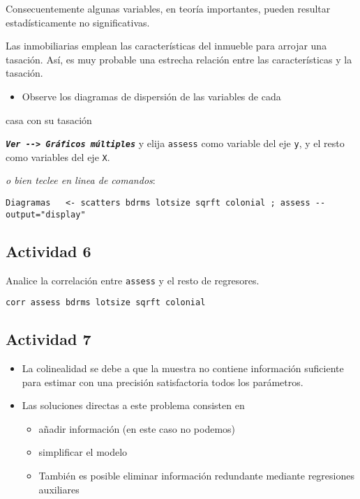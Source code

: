 \documentclass[11pt]{article}
\begin{document}
Consecuentemente algunas variables, en teoría importantes, pueden
resultar estadísticamente no significativas.

Las inmobiliarias emplean las características del inmueble para
arrojar una tasación. Así, es muy probable una estrecha relación entre
las características y la tasación.

\begin{itemize}
\item Observe los diagramas de dispersión de las variables de cada
\end{itemize}
casa con su tasación

\textbf{\emph{\texttt{Ver -{}-> Gráficos múltiples}}} y elija \texttt{assess} como variable del
eje \texttt{y}, y el resto como variables del eje \texttt{X}.
{\vspace{0pt} \color{gray!70!black}
\emph{o bien teclee en linea de comandos}:
\begin{verbatim}
Diagramas   <- scatters bdrms lotsize sqrft colonial ; assess --output="display"
\end{verbatim}
}

\subsection{Actividad 6}
\label{sec:org335d2b6}
Analice la correlación entre \texttt{assess} y el resto de regresores.
{\vspace{0pt} \color{gray!70!black}
\begin{verbatim}
corr assess bdrms lotsize sqrft colonial
\end{verbatim}
}

\subsection{Actividad 7}
\label{sec:orga7f87f7}

\begin{itemize}
\item La colinealidad se debe a que la muestra no contiene información
suficiente para estimar con una precisión satisfactoria todos los
parámetros.

\item Las soluciones directas a este problema consisten en

\begin{itemize}
\item añadir información (en este caso no podemos)
\item simplificar el modelo
\item También es posible eliminar información redundante mediante
regresiones auxiliares
\end{itemize}
\end{itemize}
\end{document}
